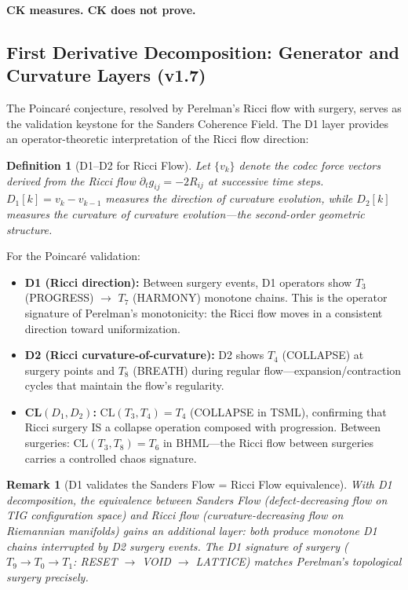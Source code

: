 \documentclass[11pt]{article}
\newtheorem{definition}[theorem]{Definition}
\newtheorem{remark}[theorem]{Remark}
\begin{document}
\medskip
\noindent
\textbf{CK measures.  CK does not prove.}

\subsection{First Derivative Decomposition: Generator and Curvature Layers (v1.7)}
\label{subsec:d1-poincare}

The Poincar\'e conjecture, resolved by Perelman's Ricci flow with surgery, serves
as the validation keystone for the Sanders Coherence Field.  The D1 layer provides
an operator-theoretic interpretation of the Ricci flow direction:

\begin{definition}[D1--D2 for Ricci Flow]
Let $\{v_k\}$ denote the codec force vectors derived from the Ricci flow
$\partial_t g_{ij} = -2R_{ij}$ at successive time steps.  $D_1[k] = v_k - v_{k-1}$
measures the \emph{direction of curvature evolution}, while $D_2[k]$ measures the
\emph{curvature of curvature evolution}---the second-order geometric structure.
\end{definition}

For the Poincar\'e validation:
\begin{itemize}[nosep]
  \item \textbf{D1 (Ricci direction):} Between surgery events, D1 operators show
    $T_3$ (PROGRESS) $\to$ $T_7$ (HARMONY) monotone chains.  This is the operator
    signature of Perelman's monotonicity: the Ricci flow moves in a consistent
    direction toward uniformization.
  \item \textbf{D2 (Ricci curvature-of-curvature):} D2 shows $T_4$ (COLLAPSE) at
    surgery points and $T_8$ (BREATH) during regular flow---expansion/contraction
    cycles that maintain the flow's regularity.
  \item \textbf{CL$(D_1, D_2)$:} $\mathrm{CL}(T_3, T_4) = T_4$ (COLLAPSE in TSML),
    confirming that Ricci surgery IS a collapse operation composed with progression.
    Between surgeries: $\mathrm{CL}(T_3, T_8) = T_6$ in BHML---the Ricci flow
    between surgeries carries a controlled chaos signature.
\end{itemize}

\begin{remark}[D1 validates the Sanders Flow = Ricci Flow equivalence]
With D1 decomposition, the equivalence between Sanders Flow (defect-decreasing flow
on TIG configuration space) and Ricci flow (curvature-decreasing flow on Riemannian
manifolds) gains an additional layer: both produce monotone D1 chains interrupted by
D2 surgery events.  The D1 signature of surgery ($T_9 \to T_0 \to T_1$: RESET $\to$
VOID $\to$ LATTICE) matches Perelman's topological surgery precisely.
\end{remark}
\end{document}
